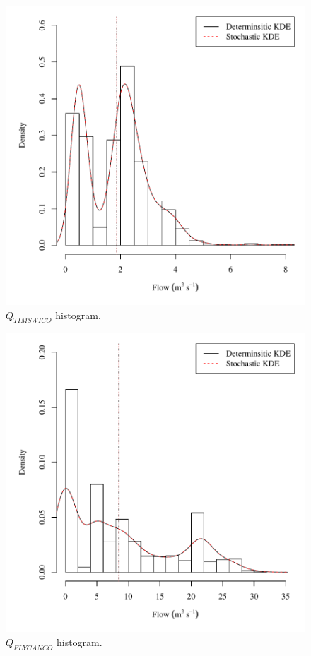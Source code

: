 \begin{center}
\begin{figure}[htbp]
	\includegraphics[width=6in]{"Figures/Results_USR/V density qTIM"}
	\caption{$Q_{TIMSWICO}$ histogram.}
\end{figure}
\end{center}
\newpage

\begin{center}
\begin{figure}[htbp]
	\includegraphics[width=6in]{"Figures/Results_USR/V density qFLY"}
	\caption{$Q_{FLYCANCO}$ histogram.}
\end{figure}
\end{center}
\newpage

